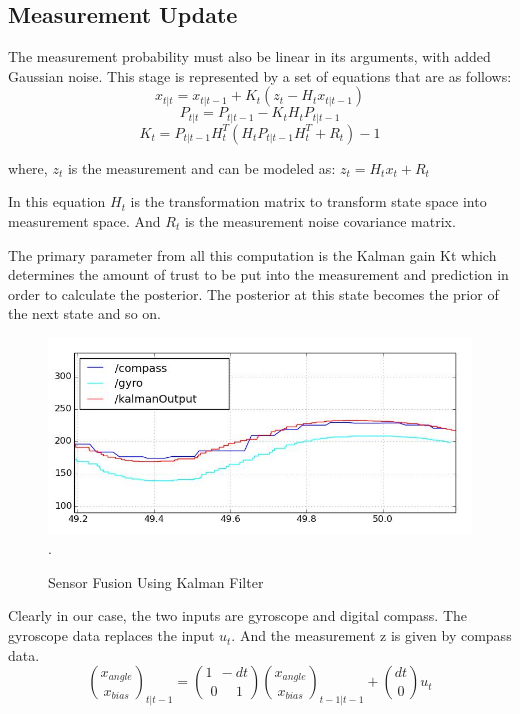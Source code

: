 \documentclass[journal,twoside]{IEEEtran}
\begin{document}
\subsection{Measurement Update}
\noindent The measurement probability must also be linear in its arguments, with added Gaussian noise. This stage is represented by a set of equations that are as follows:
\begin{equation}
x_{t|t} = x_{t|t-1} + K_t(z_t-H_t x_{t|t-1})
\end{equation} 
\begin{equation}
P_{t|t} = P_{t|t-1} - K_t H_t P_{t|t-1}
\end{equation} 
\begin{equation}
K_t = P_{t|t-1} H_t^T (H_t P_{t|t-1} H_t^T + R_t)-1
\end{equation} 
\par\noindent where,\newline
$z_t$ is the measurement and can be modeled as: $z_t = H_t x_t + R_t$
\par\noindent In this equation $H_t$ is the transformation matrix to transform state space into measurement space. And $R_t$ is the measurement noise covariance matrix.
\par\noindent The primary parameter from all this computation is the Kalman gain Kt which determines the amount of trust to be put into the measurement and prediction in order to calculate the posterior. The posterior at this state becomes the prior of the next state and so on. 
\begin{figure}[h]
\centering
\includegraphics[scale=.3]{2.jpg}
\DeclareGraphicsExtensions.
\caption{Sensor Fusion Using Kalman Filter}
\end{figure}
\par\noindent Clearly in our case, the two inputs are gyroscope and digital compass. The gyroscope data replaces the input $u_t$. And the measurement z is given by compass data.
\begin{equation}
\binom{x_{angle}}{x_{bias}}_{t|t-1} = \binom{1~~-dt}{0~~~~~~1} \binom{x_{angle}}{x_{bias}}_{t-1|t-1} + \binom{dt}{0} u_t
\end{equation}
\end{document}
